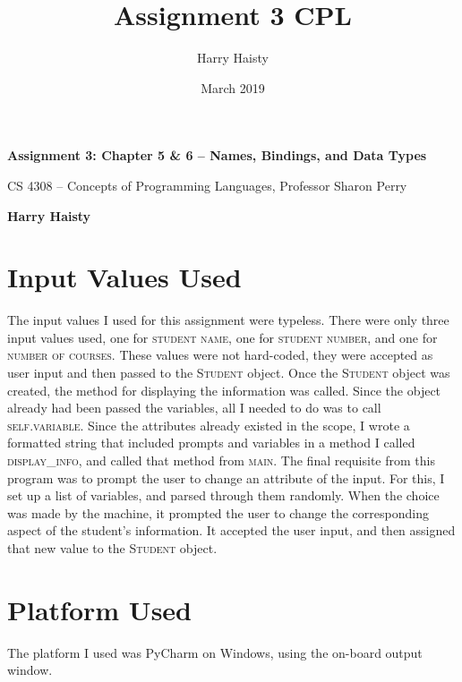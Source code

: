 \documentclass{article}
\title{Assignment 3 CPL}
\author{Harry Haisty}
\date{March 2019}
\begin{document}
\begin{titlepage}
   \begin{center}
       \vspace*{4cm}
 
       \textbf{Assignment 3: Chapter 5 \& 6 -- Names, Bindings, and Data Types}
 
       \vspace{0.5cm}
        CS 4308 -- Concepts of Programming Languages, Professor Sharon Perry

       \vspace{.5cm}
 
       \textbf{Harry Haisty}
       \vfill
 
       \vspace{0.8cm}
 
   \end{center}
\end{titlepage}

\section*{Input Values Used}
The input values I used for this assignment were typeless. There were only three input values used, one for \textsc{student name}, one for \textsc{student number}, and one for \textsc{number of courses}. These values were not hard-coded, they were accepted as user input and then passed to the \textsc{Student} object. 
\newline \newline
Once the \textsc{Student} object was created, the method for displaying the information was called. Since the object already had been passed the variables, all I needed to do was to call \textsc{self.variable}. Since the attributes already existed in the scope, I wrote a formatted string that included prompts and variables in a method I called \textsc{display\_info}, and called that method from \textsc{main}. 
\newline \newline
The final requisite from this program was to prompt the user to change an attribute of the input. For this, I set up a list of variables, and parsed through them randomly. When the choice was made by the machine, it prompted the user to change the corresponding aspect of the student's information. It accepted the user input, and then assigned that new value to the \textsc{Student} object. 

\section*{Platform Used}
The platform I used was PyCharm on Windows, using the on-board output window. 
\end{document}
